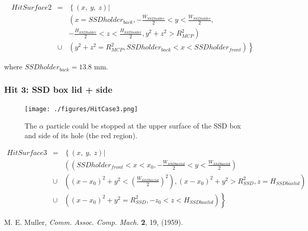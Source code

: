 \documentclass{article}
\begin{document}
\begin{eqnarray*}
	HitSurface2 & = & \left\{(x,~y,~z) \right| \\
	& & \left( x=SSDholder_{back}, -\frac{W_{SSDholder}}{2}  < y < \frac{W_{SSDholder}}{2},\right. \\
	& & \left. -\frac{H_{SSDholder}}{2} < z < \frac{H_{SSDholder}}{2}, y^2+z^2 > R_{MCP}^2 \right) \\
	& \cup & \left. \left( y^2+z^2 = R_{MCP}^2, SSDholder_{back} < x < SSDholder_{front} \right) \right\}
\end{eqnarray*}

where $SSDholder_{back} = 13.8$ mm.

\subsubsection{Hit 3: SSD box lid + side}

\begin{figure}[H]
  \begin{center}
    \texttt{[image: ./figures/HitCase3.png]}
	  \caption{The $\alpha$ particle could be stopped at the upper surface of the SSD box and side of its hole (the red region).}
    \label{fig:HitCase3}
  \end{center}
\end{figure}

\begin{eqnarray*}
	HitSurface3 & = & \left\{(x,~y,~z) \right| \\
	& & \left( \left( SSDholder_{front} < x < x_0, -\frac{W_{SSDboxlid}}{2} < y < \frac{W_{SSDboxlid}}{2} \right) \right. \\
	& \cup & \left. \left( (x-x_0)^2+y^2<\left(\frac{W_{SSDboxlid}}{2}\right)^2 \right), (x-x_0)^2+y^2 > R_{SSD}^2, z = H_{SSDboxlid} \right) \\
	& \cup & \left. \left( (x-x_0)^2+y^2 = R_{SSD}^2, -z_0 < z < H_{SSDboxlid} \right) \right\}
\end{eqnarray*}


\begin{thebibliography}{9}
	 M. E. Muller, {\it Comm. Assoc. Comp. Mach.} {\bf 2}, 19, (1959).
\end{thebibliography}
\end{document}
